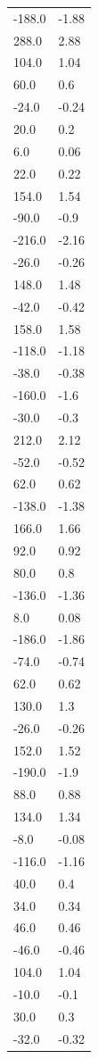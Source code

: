 \begin{longtable}{ll}
-188.0 & -1.88 \\
288.0 & 2.88 \\
104.0 & 1.04 \\
60.0 & 0.6 \\
-24.0 & -0.24 \\
20.0 & 0.2 \\
6.0 & 0.06 \\
22.0 & 0.22 \\
154.0 & 1.54 \\
-90.0 & -0.9 \\
-216.0 & -2.16 \\
-26.0 & -0.26 \\
148.0 & 1.48 \\
-42.0 & -0.42 \\
158.0 & 1.58 \\
-118.0 & -1.18 \\
-38.0 & -0.38 \\
-160.0 & -1.6 \\
-30.0 & -0.3 \\
212.0 & 2.12 \\
-52.0 & -0.52 \\
62.0 & 0.62 \\
-138.0 & -1.38 \\
166.0 & 1.66 \\
92.0 & 0.92 \\
80.0 & 0.8 \\
-136.0 & -1.36 \\
8.0 & 0.08 \\
-186.0 & -1.86 \\
-74.0 & -0.74 \\
62.0 & 0.62 \\
130.0 & 1.3 \\
-26.0 & -0.26 \\
152.0 & 1.52 \\
-190.0 & -1.9 \\
88.0 & 0.88 \\
134.0 & 1.34 \\
-8.0 & -0.08 \\
-116.0 & -1.16 \\
40.0 & 0.4 \\
34.0 & 0.34 \\
46.0 & 0.46 \\
-46.0 & -0.46 \\
104.0 & 1.04 \\
-10.0 & -0.1 \\
30.0 & 0.3 \\
-32.0 & -0.32 \\

\end{longtable}
